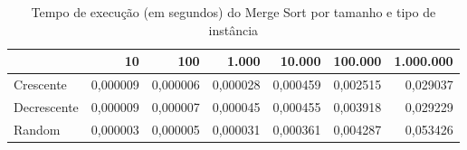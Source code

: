 \begin{table}[htbp]
    \centering
    \begin{tabular}{|l|r|r|r|r|r|r|}
        \hline
         & 10 & 100 & 1.000 & 10.000 & 100.000 & 1.000.000 \\
        \hline
        Crescente & 0,000009 & 0,000006 & 0,000028 & 0,000459 & 0,002515 & 0,029037 \\
        \hline
        Decrescente & 0,000009 & 0,000007 & 0,000045 & 0,000455 & 0,003918 & 0,029229 \\
        \hline
        Random & 0,000003 & 0,000005 & 0,000031 & 0,000361 & 0,004287 & 0,053426 \\
        \hline
    \end{tabular}
    \caption{Tempo de execução (em segundos) do Merge Sort por tamanho e tipo de instância}
    \label{tab:tempos_merge}
\end{table}
